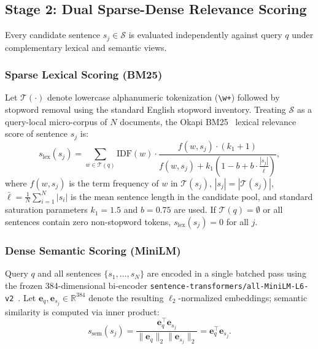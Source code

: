 \documentclass[conference]{IEEEtran}
\begin{document}
\subsection{Stage 2: Dual Sparse-Dense Relevance Scoring}
Every candidate sentence $s_j \in \mathcal{S}$ is evaluated independently against query $q$ under complementary lexical and semantic views.

\subsubsection{Sparse Lexical Scoring (BM25)}
Let $\mathcal{T}(\cdot)$ denote lowercase alphanumeric tokenization (\texttt{\textbackslash w+}) followed by stopword removal using the standard English stopword inventory. Treating $\mathcal{S}$ as a query-local micro-corpus of $N$ documents, the Okapi BM25~\cite{robertson2009bm25} lexical relevance score of sentence $s_j$ is:
\begin{equation}
s_{\mathrm{lex}}(s_j) = \sum_{w \in \mathcal{T}(q)} \mathrm{IDF}(w) \cdot \frac{f(w, s_j) \cdot (k_1 + 1)}{f(w, s_j) + k_1 \left(1 - b + b \cdot \frac{|s_j|}{\bar{\ell}}\right)},
\end{equation}
where $f(w, s_j)$ is the term frequency of $w$ in $\mathcal{T}(s_j)$, $|s_j| = |\mathcal{T}(s_j)|$, $\bar{\ell} = \frac{1}{N}\sum_{i=1}^N |s_i|$ is the mean sentence length in the candidate pool, and standard saturation parameters $k_1 = 1.5$ and $b = 0.75$ are used. If $\mathcal{T}(q) = \emptyset$ or all sentences contain zero non-stopword tokens, $s_{\mathrm{lex}}(s_j) = 0$ for all $j$.

\subsubsection{Dense Semantic Scoring (MiniLM)}
Query $q$ and all sentences $\{s_1, \dots, s_N\}$ are encoded in a single batched pass using the frozen 384-dimensional bi-encoder \texttt{sentence-transformers/all-MiniLM-L6-v2}~\cite{wang2020minilm,reimers2019sbert}. Let $\mathbf{e}_q, \mathbf{e}_{s_j} \in \mathbb{R}^{384}$ denote the resulting $\ell_2$-normalized embeddings; semantic similarity is computed via inner product:
\begin{equation}
s_{\mathrm{sem}}(s_j) = \frac{\mathbf{e}_q^\top \mathbf{e}_{s_j}}{\|\mathbf{e}_q\|_2 \|\mathbf{e}_{s_j}\|_2} = \mathbf{e}_q^\top \mathbf{e}_{s_j}.
\end{equation}
\end{document}
